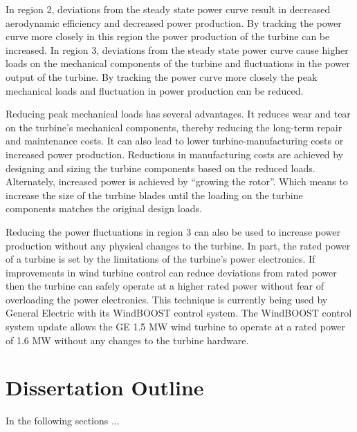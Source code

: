 In region 2, deviations from the steady state power curve result in decreased aerodynamic efficiency and decreased power production.  By tracking the power curve more closely in this region the power production of the turbine can be increased.  In region 3, deviations from the steady state power curve cause higher loads on the mechanical components of the turbine and fluctuations in the power output of the turbine.  By tracking the power curve more closely the peak mechanical loads and fluctuation in power production can be reduced.

Reducing peak mechanical loads has several advantages.  It reduces wear and tear on the turbine’s mechanical components, thereby reducing the long-term repair and maintenance costs.  It can also lead to lower turbine-manufacturing costs or increased power production.  Reductions in manufacturing costs are achieved by designing and sizing the turbine components based on the reduced loads.  Alternately, increased power is achieved by “growing the rotor”.  Which means to increase the size of the turbine blades until the loading on the turbine components matches the original design loads.

Reducing the power fluctuations in region 3 can also be used to increase power production without any physical changes to the turbine.  In part, the rated power of a turbine is set by the limitations of the turbine’s power electronics.  If improvements in wind turbine control can reduce deviations from rated power then the turbine can safely operate at a higher rated power without fear of overloading the power electronics.  This technique is currently being used by General Electric with its WindBOOST control system. The WindBOOST control system update allows the GE 1.5 MW wind turbine to operate at a rated power of 1.6 MW without any changes to the turbine hardware. \cite{GE2009}




\section{Dissertation Outline}

In the following sections ...